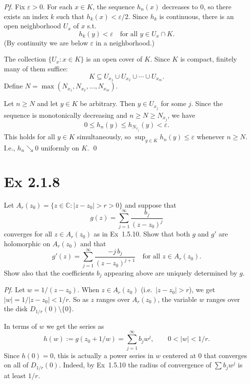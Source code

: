 \documentclass[a4paper]{article}
\begin{document}
\textit{Pf.} Fix $\varepsilon > 0$.  For each $x \in K$, the sequence $h_n(x)$ decreases to $0$, so there exists an index $k$ such that $h_{k}(x) < \varepsilon/2$.  Since $h_{k}$ is continuous, there is an open neighborhood $U_x$ of $x$ s.t.
\[
h_{k}(y) < \varepsilon \quad \text{for all } y \in U_x \cap K.
\]
(By continuity we are below $\varepsilon$ in a neighborhood.)

\medskip
The collection $\{U_x : x \in K\}$ is an open cover of $K$.  Since $K$ is compact, finitely many of them suffice:
\[
K \subseteq U_{x_1} \cup U_{x_2} \cup \cdots \cup U_{x_m}.
\]
Define $N = \max(N_{x_1}, N_{x_2}, \ldots, N_{x_m})$.

\medskip
Let $n \geq N$ and let $y \in K$ be arbitrary.  Then $y \in U_{x_j}$ for some $j$.  Since the sequence is monotonically decreasing and $n \geq N \geq N_{x_j}$, we have
\[
0 \leq h_n(y) \leq h_{N_{x_j}}(y) < \varepsilon.
\]
This holds for all $y \in K$ simultaneously, so $\sup_{y\in K} h_n(y) \leq \varepsilon$ whenever $n \geq N$.  I.e., $h_n \searrow 0$ uniformly on $K$. \qed

\newpage

\section*{Ex 2.1.8}

\begin{tcolorbox}[colback=gray!10, colframe=black, boxrule=0.5pt, arc=2mm]
Let $A_r(z_0) = \{z \in \mathbb{C} : |z-z_0| > r > 0\}$ and suppose that
\[
g(z) = \sum_{j=1}^{\infty} \frac{b_j}{(z-z_0)^j}
\]
converges for all $z \in A_r(z_0)$ as in Ex~1.5.10. Show that both $g$ and $g'$ are holomorphic on $A_r(z_0)$ and that
\[
g'(z) = \sum_{j=1}^{\infty} \frac{-j\,b_j}{(z-z_0)^{j+1}} \quad \text{for all } z \in A_r(z_0).
\]
Show also that the coefficients $b_j$ appearing above are uniquely determined by $g$.
\end{tcolorbox}

\textit{Pf.} Let $w = 1/(z - z_0)$.  When $z \in A_r(z_0)$ (i.e.\ $|z - z_0| > r$), we get $|w| = 1/|z-z_0| < 1/r$. So as $z$ ranges over $A_r(z_0)$, the variable $w$ ranges over the disk $D_{1/r}(0) \setminus \{0\}$.

In terms of $w$ we get the series as
\[
h(w) := g(z_0 + 1/w) = \sum_{j=1}^{\infty} b_j w^j, \qquad 0 < |w| < 1/r.
\]
Since $h(0) = 0$, this is actually a power series in $w$ centered at $0$ that converges on all of $D_{1/r}(0)$.  Indeed, by Ex~1.5.10 the radius of convergence of $\sum b_j w^j$ is at least $1/r$.
\end{document}
